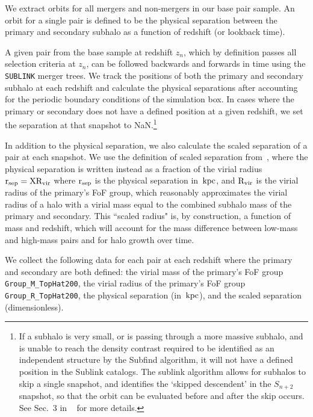 \documentclass[twocolumn,linenumbers]{aastex631}
\newcommand{\Rvir}{\ensuremath{\rm R_{vir}}}
\newcommand{\Rsc}{\ensuremath{\rm R_{sc}}}
\newcommand{\rsep}{\ensuremath{\rm r_{sep}}}
\begin{document}
We extract orbits for all mergers and non-mergers in our base pair sample. 
An orbit for a single pair is defined to be the physical separation between the primary and secondary subhalo as a function of redshift (or lookback time). 

A given pair from the base sample at redshift $z_n$, which by definition passes all selection criteria at $z_n$, can be followed backwards and forwards in time using the \texttt{SUBLINK} merger trees.  
We track the positions of both the primary and secondary subhalo at each redshift and calculate the physical separations after accounting for the periodic boundary conditions of the simulation box.
In cases where the primary or secondary does not have a defined position at a given redshift, we set the separation at that snapshot to NaN.\footnote{If a subhalo is very small, or is passing through a more massive subhalo, and is unable to reach the density contrast required to be identified as an independent structure by the Subfind algorithm, it will not have a defined position in the Sublink catalogs. The sublink algorithm allows for subhalos to skip a single snapshot, and identifies the `skipped descendent' in the $S_{n+2}$ snapshot, so that the orbit can be evaluated before and after the skip occurs. See Sec.~3 in ~\citet{RG2015} for more details.}

In addition to the physical separation, we also calculate the scaled separation of a pair at each snapshot. We use the definition of scaled separation from~\cite{Chamberlain2024}, where the physical separation is written instead as a fraction of the virial radius $\rsep=X\Rvir$
where $\rsep$ is the physical separation in $\mathrm{\,kpc}$, and $\Rvir$ is the virial radius of the primary's FoF group, which reasonably approximates the virial radius of a halo with a virial mass equal to the combined subhalo mass of the primary and secondary.
This ``scaled radius" is, by construction, a function of mass and redshift, which will account for the mass difference between low-mass and high-mass pairs and for halo growth over time. 

We collect the following data for each pair at each redshift where the primary and secondary are both defined: the virial mass of the primary's FoF group \texttt{Group\_M\_TopHat200}, the virial radius of the primary's FoF group \texttt{Group\_R\_TopHat200}, the physical separation (in $\mathrm{\,kpc}$), and the scaled separation (dimensionless).
\end{document}

